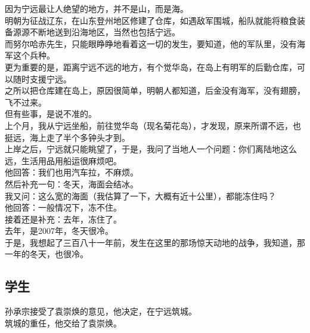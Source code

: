 \begin{multicols}{\theparacolNo}
因为宁远最让人绝望的地方，并不是山，而是海。\\

明朝为征战辽东，在山东登州地区修建了仓库，如遇敌军围城，船队就能将粮食装备源源不断地送到沿海地区，当然也包括宁远。\\

而努尔哈赤先生，只能眼睁睁地看着这一切的发生，要知道，他的军队里，没有海军这个兵种。\\

更为重要的是，距离宁远不远的地方，有个觉华岛，在岛上有明军的后勤仓库，可以随时支援宁远。\\

之所以把仓库建在岛上，原因很简单，明朝人都知道，后金没有海军，没有翅膀，飞不过来。\\

但有些事，是说不准的。\\

上个月，我从宁远坐船，前往觉华岛（现名菊花岛），才发现，原来所谓不远，也挺远，海上走了半个多钟头才到。\\

上岸之后，宁远就只能眺望了，于是，我问了当地人一个问题：你们离陆地这么远，生活用品用船运很麻烦吧。\\

他回答：我们也用汽车拉，不麻烦。\\

然后补充一句：冬天，海面会结冰。\\

我又问：这么宽的海面（我估算了一下，大概有近十公里），都能冻住吗？\\

他回答：一般情况下，冻不住。\\

接着还是补充：去年，冻住了。\\

去年，是2007年，冬天很冷。\\

于是，我想起了三百八十一年前，发生在这里的那场惊天动地的战争，我知道，那一年的冬天，也很冷。\\

\subsection{学生}
孙承宗接受了袁崇焕的意见，他决定，在宁远筑城。\\

筑城的重任，他交给了袁崇焕。\\


\end{multicols}
